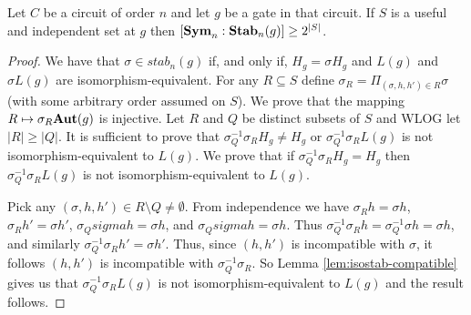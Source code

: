 \documentclass[../paper.tex]{subfiles}
\begin{document}
\begin{lem}
  \label{lem:useful-independant-set}
  Let $C$ be a circuit of order $n$ and let $g$ be a gate in that circuit. If
  $S$ is a useful and independent set at $g$ then $[\text{\textbf{Sym}}_n : \text{\textbf{Stab}}_n(g)] \geq
  2^{\vert S \vert}$.
\end{lem}
\begin{proof}
  We have that $\sigma \in stab_n(g)$ if, and only if, $H_g = \sigma H_g$ and
  $L(g)$ and $\sigma L(g)$ are isomorphism-equivalent. For any $R \subseteq S$
  define $\sigma_R = \Pi_{(\sigma, h, h') \in R} \sigma$ (with some arbitrary
  order assumed on $S$). We prove that the mapping $R \mapsto \sigma_R \text{\textbf{Aut}}(g)$
  is injective. Let $R$ and $Q$ be distinct subsets of $S$ and WLOG let $\vert R
  \vert \geq \vert Q \vert$. It is sufficient to prove that $\sigma^{-1}_Q
  \sigma_R H_g \neq H_g$ or $\sigma^{-1}_Q \sigma_R L(g)$ is not
  isomorphism-equivalent to $L(g)$. We prove that if $\sigma^{-1}_Q \sigma_R H_g
  = H_g$ then $\sigma^{-1}_Q \sigma_R L(g)$ is not isomorphism-equivalent to
  $L(g)$.

  Pick any $(\sigma, h, h') \in R \setminus Q \neq \emptyset$. From independence
  we have $\sigma_R h = \sigma h$, $\sigma_R h' = \sigma h'$, $\sigma_Q sigma h
  = \sigma h $, and $\sigma_Q sigma h = \sigma h$. Thus $\sigma^{-1}_Q \sigma_R
  h = \sigma^{-1}_Q \sigma h = \sigma h$, and similarly $\sigma^{-1}_Q\sigma_R
  h' = \sigma h'$. Thus, since $(h, h')$ is incompatible with $\sigma$, it
  follows $(h, h')$ is incompatible with $\sigma^{-1}_Q\sigma_R$. So Lemma
  \ref{lem:isostab-compatible} gives us that $\sigma^{-1}_Q \sigma_R L(g)$ is
  not isomorphism-equivalent to $L(g)$ and the result follows.
\end{proof}

%



\end{document}
